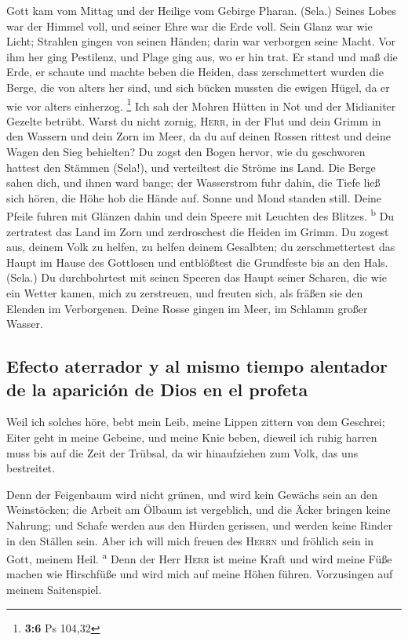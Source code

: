  Gott kam vom Mittag und der Heilige vom Gebirge Pharan.
(Sela.) Seines Lobes war der Himmel voll, und seiner Ehre war die Erde
voll.  Sein Glanz war wie Licht; Strahlen gingen von
seinen Händen; darin war verborgen seine Macht.  Vor ihm
her ging Pestilenz, und Plage ging aus, wo er hin trat. 
Er stand und maß die Erde, er schaute und machte beben die Heiden, dass
zerschmettert wurden die Berge, die von alters her sind, und sich bücken
mussten die ewigen Hügel, da er wie vor alters einherzog. \footnote{\textbf{3:6}
  Ps 104,32}  Ich sah der Mohren Hütten in Not und der
Midianiter Gezelte betrübt.  Warst du nicht zornig,
\textsc{Herr}, in der Flut und dein Grimm in den Wassern und dein Zorn
im Meer, da du auf deinen Rossen rittest und deine Wagen den Sieg
behielten?  Du zogst den Bogen hervor, wie du geschworen
hattest den Stämmen (Sela!), und verteiltest die Ströme ins Land.
 Die Berge sahen dich, und ihnen ward bange; der
Wasserstrom fuhr dahin, die Tiefe ließ sich hören, die Höhe hob die
Hände auf.  Sonne und Mond standen still. Deine Pfeile
fuhren mit Glänzen dahin und dein Speere mit Leuchten des Blitzes.
\textsuperscript{b}  Du zertratest das Land im Zorn und
zerdroschest die Heiden im Grimm.  Du zogest aus, deinem
Volk zu helfen, zu helfen deinem Gesalbten; du zerschmettertest das
Haupt im Hause des Gottlosen und entblößtest die Grundfeste bis an den
Hals. (Sela.)  Du durchbohrtest mit seinen Speeren das
Haupt seiner Scharen, die wie ein Wetter kamen, mich zu zerstreuen, und
freuten sich, als fräßen sie den Elenden im Verborgenen. 
Deine Rosse gingen im Meer, im Schlamm großer Wasser.

\hypertarget{efecto-aterrador-y-al-mismo-tiempo-alentador-de-la-apariciuxf3n-de-dios-en-el-profeta}{%
\subsection{Efecto aterrador y al mismo tiempo alentador de la aparición
de Dios en el
profeta}\label{efecto-aterrador-y-al-mismo-tiempo-alentador-de-la-apariciuxf3n-de-dios-en-el-profeta}}

 Weil ich solches höre, bebt mein Leib, meine Lippen
zittern von dem Geschrei; Eiter geht in meine Gebeine, und meine Knie
beben, dieweil ich ruhig harren muss bis auf die Zeit der Trübsal, da
wir hinaufziehen zum Volk, das uns bestreitet.

 Denn der Feigenbaum wird nicht grünen, und wird kein
Gewächs sein an den Weinstöcken; die Arbeit am Ölbaum ist vergeblich,
und die Äcker bringen keine Nahrung; und Schafe werden aus den Hürden
gerissen, und werden keine Rinder in den Ställen sein. 
Aber ich will mich freuen des \textsc{Herrn} und fröhlich sein in Gott,
meinem Heil. \textsuperscript{a}  Denn der Herr
\textsc{Herr} ist meine Kraft und wird meine Füße machen wie Hirschfüße
und wird mich auf meine Höhen führen. Vorzusingen auf meinem
Saitenspiel.
